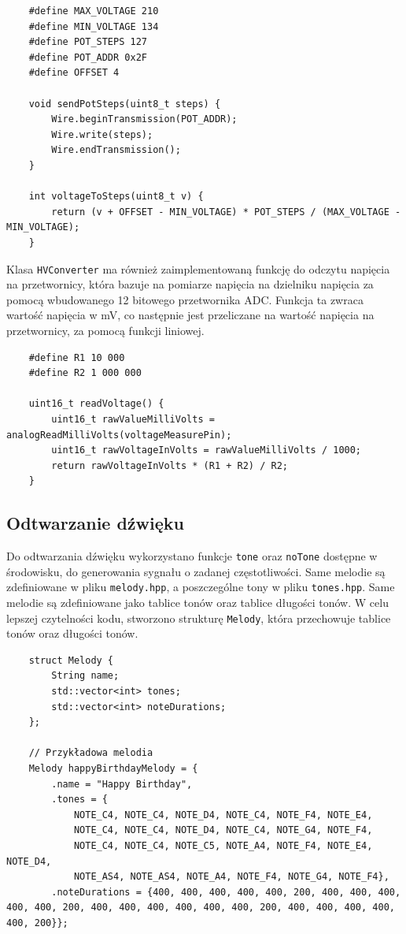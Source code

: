 \documentclass[../main.tex]{subfiles}
\begin{document}
\begin{verbatim}
    #define MAX_VOLTAGE 210
    #define MIN_VOLTAGE 134
    #define POT_STEPS 127
    #define POT_ADDR 0x2F
    #define OFFSET 4

    void sendPotSteps(uint8_t steps) {
        Wire.beginTransmission(POT_ADDR);
        Wire.write(steps);
        Wire.endTransmission();
    }
    
    int voltageToSteps(uint8_t v) {
        return (v + OFFSET - MIN_VOLTAGE) * POT_STEPS / (MAX_VOLTAGE - MIN_VOLTAGE);
    }

\end{verbatim}

Klasa \texttt{HVConverter} ma również zaimplementowaną funkcję do odczytu napięcia na przetwornicy, która bazuje na pomiarze napięcia na dzielniku napięcia za pomocą 
wbudowanego 12 bitowego przetwornika ADC. Funkcja ta zwraca wartość napięcia w mV, co następnie jest przeliczane na wartość napięcia na przetwornicy, za pomocą 
funkcji liniowej.

\begin{verbatim}
    #define R1 10 000
    #define R2 1 000 000

    uint16_t readVoltage() {
        uint16_t rawValueMilliVolts = analogReadMilliVolts(voltageMeasurePin);
        uint16_t rawVoltageInVolts = rawValueMilliVolts / 1000;
        return rawVoltageInVolts * (R1 + R2) / R2;
    }
\end{verbatim}

\subsection{Odtwarzanie dźwięku}
Do odtwarzania dźwięku wykorzystano funkcje \texttt{tone} oraz \texttt{noTone} dostępne w środowisku, do generowania sygnału o zadanej częstotliwości.
Same melodie są zdefiniowane w pliku \texttt{melody.hpp}, a poszczególne tony w pliku \texttt{tones.hpp}. Same melodie są zdefiniowane jako tablice tonów oraz tablice długości tonów.
W celu lepszej czytelności kodu, stworzono strukturę \texttt{Melody}, która przechowuje tablice tonów oraz długości tonów.

\begin{verbatim}
    struct Melody {
        String name;
        std::vector<int> tones;
        std::vector<int> noteDurations;
    };
    
    // Przykładowa melodia
    Melody happyBirthdayMelody = {
        .name = "Happy Birthday",
        .tones = {
            NOTE_C4, NOTE_C4, NOTE_D4, NOTE_C4, NOTE_F4, NOTE_E4,
            NOTE_C4, NOTE_C4, NOTE_D4, NOTE_C4, NOTE_G4, NOTE_F4,
            NOTE_C4, NOTE_C4, NOTE_C5, NOTE_A4, NOTE_F4, NOTE_E4, NOTE_D4,
            NOTE_AS4, NOTE_AS4, NOTE_A4, NOTE_F4, NOTE_G4, NOTE_F4},
        .noteDurations = {400, 400, 400, 400, 400, 200, 400, 400, 400, 400, 400, 200, 400, 400, 400, 400, 400, 400, 200, 400, 400, 400, 400, 400, 200}};
\end{verbatim}
\end{document}
